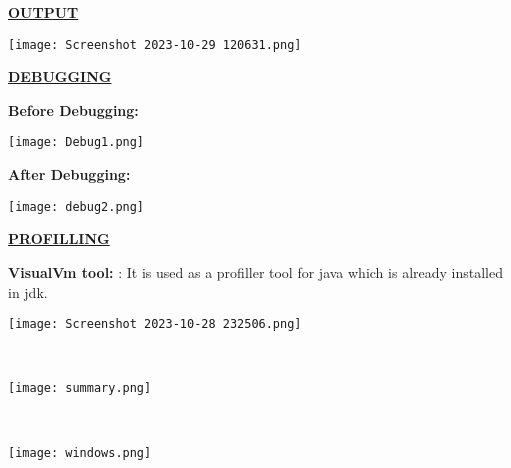 \documentclass{article}
\begin{document}
\begin{enumerate}
\begin{enumerate}
\begin{enumerate}
    \end{enumerate}
    \pagebreak{}
\begin{center}
    \LARGE \underline{\textbf{OUTPUT }}    
\end{center}
\begin{center}
\texttt{[image: Screenshot 2023-10-29 120631.png]}
\end{center}
\pagebreak{}
\begin{center}
    \LARGE \underline{\textbf{DEBUGGING }}\\
\end{center}
 \textbf{Before Debugging:}\\
   \begin{center}
\texttt{[image: Debug1.png]}
\end{center}
\textbf{After Debugging:}\\
\begin{center}
\texttt{[image: debug2.png]}
\end{center}
\pagebreak{}
\begin{center}
    \LARGE \underline{\textbf{PROFILLING }}\\
 \end{center}   
 \LARGE{\textbf{VisualVm tool:} } : It is used as a profiller tool for java which is already installed in jdk.\\
 \begin{center}
\texttt{[image: Screenshot 2023-10-28 232506.png]}
\end{center}
\textbf{}\\
\begin{center}
\texttt{[image: summary.png]}
\end{center}
\textbf{}\\
\begin{center}
\texttt{[image: windows.png]}
\end{center}
    
\end{document}
